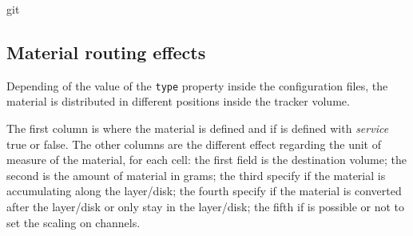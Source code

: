 git\documentclass[12pt, a4paper]{article}
\newcommand{\prop}[1]{\texttt{#1}}
\begin{document}
\subsection{Material routing effects}
Depending of the value of the \prop{type} property inside the
configuration files, the material is distributed in different
positions inside the tracker volume. 

The first column is where the material is defined and if is defined
with \emph{service} true or false. The other columns are the different
effect regarding the unit of measure of the material, for each cell:
the first field is the destination volume; the second is the amount of
material in grams; the third specify if the material is accumulating
along the layer/disk; the fourth specify if the material is converted
after the layer/disk or only stay in the layer/disk; the fifth if is
possible or not to set the scaling on channels.
\end{document}
